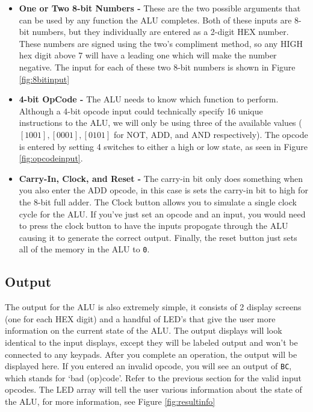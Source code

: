 \documentclass[a4paper,11pt]{article}
\begin{document}
  \begin{itemize}
  \item \textbf{One or Two 8-bit Numbers -} These are the two possible arguments that can be used by any function the ALU completes. Both of these inputs are 8-bit numbers, but they individually are entered as a 2-digit HEX number. These numbers are signed using the two's compliment method, so any HIGH hex digit above 7 will have a leading one which will make the number negative. The input for each of these two 8-bit numbers is shown in Figure \ref{fig:8bitinput}

  \item \textbf{4-bit OpCode -} The ALU needs to know which function to perform. Although a 4-bit opcode input could technically specify 16 unique instructions to the ALU, we will only be using three of the available values ( $[1001], [0001], [0101]$ for NOT, ADD, and AND respectively). The opcode is entered by setting 4 switches to either a high or low state, as seen in Figure \ref{fig:opcodeinput}.

  \item \textbf{Carry-In, Clock, and Reset -} The carry-in bit only does something when you also enter the ADD opcode, in this case is sets the carry-in bit to high for the 8-bit full adder. The Clock button allows you to simulate a single clock cycle for the ALU. If you've just set an opcode and an input, you would need to press the clock button to have the inputs propogate through the ALU causing it to generate the correct output. Finally, the reset button just sets all of the memory in the ALU to \texttt{0}.

  \end{itemize}
 \subsection{Output}

  The output for the ALU is also extremely simple, it consists of 2 display screens (one for each HEX digit) and a handful of LED's that give the user more information on the current state of the ALU. The output displays will look identical to the input displays, except they will be labeled output and won't be connected to any keypads. After you complete an operation, the output will be displayed here. If you entered an invalid opcode, you will see an output of \texttt{BC}, which stands for `bad (op)code'. Refer to the previous section for the valid input opcodes. The LED array will tell the user various information about the state of the ALU, for more information, see Figure \ref{fig:resultinfo}
\end{document}
